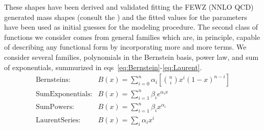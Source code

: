 These shapes have been derived and validated fitting the FEWZ (NNLO QCD) generated mass shapes (consult the \cite{CMS-HIG-AN}) and the fitted values for the parameters have been used as initial guesses for the modeling procedure. The second class of functions we consider comes from general families which are, in principle, capable of describing any functional form by incorporating more and more terms. We consider several families, polynomials in the Bernstein basis, power law, and sum of exponentials, summurized in eqs~\ref{eq:Bernstein}-\ref{eq:Laurent}.
\begin{align}
        \label{eq:Bernstein}
        \text{Bernsteins:}& {B(x)} = {\sum_{i=0}^{n} \alpha_i[\binom{n}{i}x^{i}(1-x)^{n-i}]} \\
        \label{eq:SumExponentials}
        \text{SumExponentials:}& {B(x)} = {\sum_{i=1}^{n} \beta_{i}e^{\alpha_{i}x}}\\
        \label{eq:SumPowers}
        \text{SumPowers:}& {B(x)} = {\sum_{i=1}^{n} \beta_{i}x^{\alpha_{i}}}\\
        \label{eq:Laurent}
        \text{LaurentSeries:}& {B(x)} = {\sum_{i} \alpha_{i}x^{i}}
\end{align}


